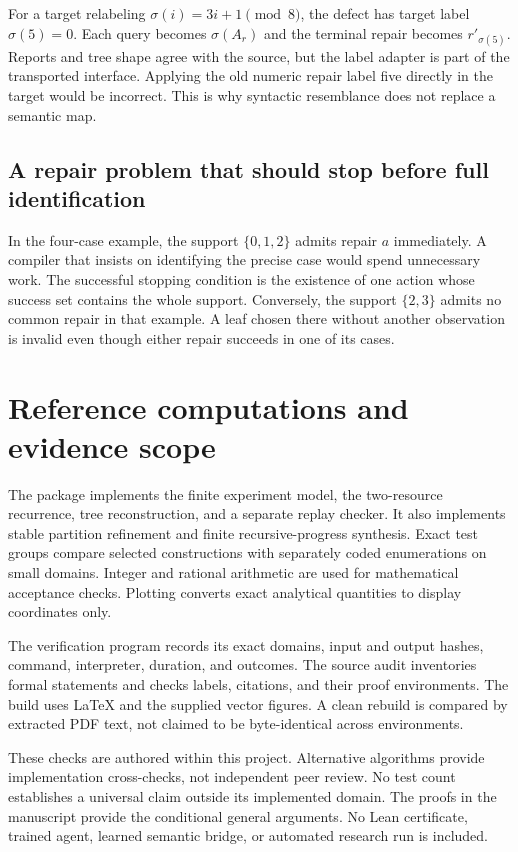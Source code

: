 \documentclass[11pt,letterpaper]{article}
\theoremstyle{plain}
\theoremstyle{definition}
\begin{document}
For a target relabeling $\sigma(i)=3i+1\pmod8$, the defect has target label $\sigma(5)=0$. Each query becomes $\sigma(A_r)$ and the terminal repair becomes $r'_{\sigma(5)}$. Reports and tree shape agree with the source, but the label adapter is part of the transported interface. Applying the old numeric repair label five directly in the target would be incorrect. This is why syntactic resemblance does not replace a semantic map.

\subsection{A repair problem that should stop before full identification}
In the four-case example, the support $\{0,1,2\}$ admits repair $a$ immediately. A compiler that insists on identifying the precise case would spend unnecessary work. The successful stopping condition is the existence of one action whose success set contains the whole support. Conversely, the support $\{2,3\}$ admits no common repair in that example. A leaf chosen there without another observation is invalid even though either repair succeeds in one of its cases.

\section{Reference computations and evidence scope}\label{app:checks}
The package implements the finite experiment model, the two-resource recurrence, tree reconstruction, and a separate replay checker. It also implements stable partition refinement and finite recursive-progress synthesis. Exact test groups compare selected constructions with separately coded enumerations on small domains. Integer and rational arithmetic are used for mathematical acceptance checks. Plotting converts exact analytical quantities to display coordinates only.

The verification program records its exact domains, input and output hashes, command, interpreter, duration, and outcomes. The source audit inventories formal statements and checks labels, citations, and their proof environments. The build uses LaTeX and the supplied vector figures. A clean rebuild is compared by extracted PDF text, not claimed to be byte-identical across environments.

These checks are authored within this project. Alternative algorithms provide implementation cross-checks, not independent peer review. No test count establishes a universal claim outside its implemented domain. The proofs in the manuscript provide the conditional general arguments. No Lean certificate, trained agent, learned semantic bridge, or automated research run is included.
\end{document}
